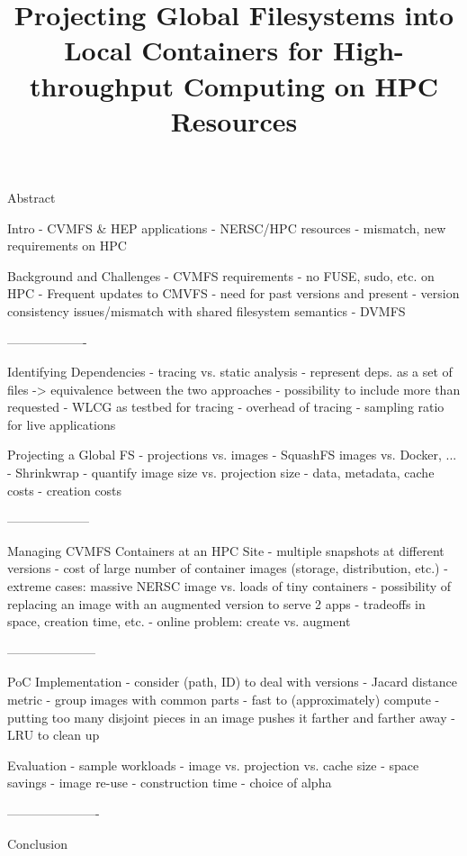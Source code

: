 \documentclass[conference]{IEEEtran}
\begin{document}
\title{Projecting Global Filesystems into Local Containers for High-throughput Computing on HPC Resources}


Abstract

Intro
- CVMFS & HEP applications
- NERSC/HPC resources
- mismatch, new requirements on HPC

Background and Challenges
- CVMFS requirements
- no FUSE, sudo, etc. on HPC
- Frequent updates to CMVFS
- need for past versions and present
- version consistency issues/mismatch with shared filesystem semantics
- DVMFS

-------------------

Identifying Dependencies
- tracing vs. static analysis
- represent deps. as a set of files -> equivalence between the two approaches
- possibility to include more than requested
- WLCG as testbed for tracing
- overhead of tracing
- sampling ratio for live applications

Projecting a Global FS
- projections vs. images
- SquashFS images vs. Docker, ...
- Shrinkwrap
- quantify image size vs. projection size
- data, metadata, cache costs
- creation costs

--------------------

Managing CVMFS Containers at an HPC Site
- multiple snapshots at different versions
- cost of large number of container images (storage, distribution, etc.)
- extreme cases: massive NERSC image vs. loads of tiny containers
- possibility of replacing an image with an augmented version to serve 2 apps
- tradeoffs in space, creation time, etc.
- online problem: create vs. augment

---------------------

PoC Implementation
- consider (path, ID) to deal with versions
- Jacard distance metric
- group images with common parts
- fast to (approximately) compute
- putting too many disjoint pieces in an image pushes it farther and farther away
- LRU to clean up

Evaluation
- sample workloads
- image vs. projection vs. cache size
- space savings
- image re-use
- construction time
- choice of alpha

----------------------

Conclusion

\fi

\author{
\and
{}
\and
{}
\and
{}
}
\end{document}
